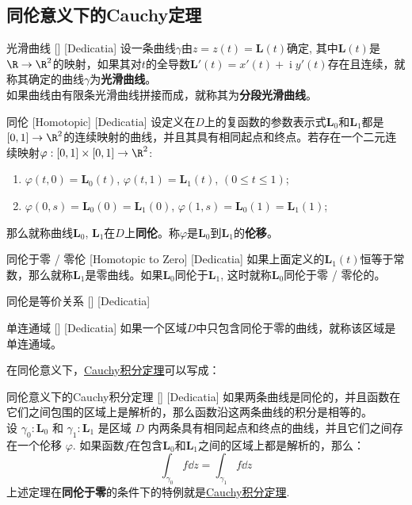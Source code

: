 \documentclass[UTF8]{ctexart}
\DeclareMathOperator{\ii}{\mathrm{i}}
\newcommand{\CauchyThm}{\hyperref[thm:Cauchy]{Cauchy积分定理}}
\begin{document}
\subsection{同伦意义下的Cauchy定理}
\begin{dfn}
    [UUID]
    {光滑曲线}
    []
    [Dedicatia]
    设一条曲线$\gamma$由$z=z(t)=\bm{L}(t)$确定, 其中$\bm{L}(t)$是$\R\to\R^2$的映射，如果其对$t$的全导数$\bm{L}'(t)=x'(t)+\ii y'(t)$存在且连续，就称其确定的曲线$\gamma$为\textbf{光滑曲线}。\\
    如果曲线由有限条光滑曲线拼接而成，就称其为\textbf{分段光滑曲线}。
\end{dfn}
\begin{dfn}
    [UUID]
    {同伦}
    [Homotopic]
    [Dedicatia]
    设定义在$D$上的复函数的参数表示式$\bm{L}_0$和$\bm{L}_1$都是$[0,1]\to\R^2$的连续映射的曲线，并且其具有相同起点和终点。若存在一个二元连续映射$\varphi:[0,1]\times[0,1]\to\R^2$:
    \begin{enumerate}
        \item $\varphi(t,0)=\bm{L}_0(t)$, $\varphi(t,1)=\bm{L}_1(t)$, $(0\leq t\leq 1)$;
        \item $\varphi(0,s)=\bm{L}_0(0)=\bm{L}_1(0)$, $\varphi(1,s)=\bm{L}_0(1)=\bm{L}_1(1)$;
    \end{enumerate}
    那么就称曲线$\bm{L}_0$, $\bm{L}_1$在$D$上\textbf{同伦}。称$\varphi$是$\bm{L}_0$到$\bm{L}_1$的\textbf{伦移}。
\end{dfn}
\begin{dfn}
    [UUID]
    {同伦于零 / 零伦}
    [Homotopic to Zero]
    [Dedicatia]
    如果上面定义的$\bm{L}_1(t)$恒等于常数，那么就称$\bm{L}_1$是零曲线。如果$\bm{L}_0$同伦于$\bm{L}_1$, 这时就称$\bm{L}_0$同伦于零 / 零伦的。
\end{dfn}
\begin{ppt}
    [UUID]
    {同伦是等价关系}
    []
    [Dedicatia]
\end{ppt}
\begin{dfn}
    [UUID]
    {单连通域}
    []
    [Dedicatia]
    如果一个区域$D$中只包含同伦于零的曲线，就称该区域是单连通域。
\end{dfn}
在同伦意义下，\CauchyThm 可以写成：
\begin{thm}
    [UUID]
    {同伦意义下的Cauchy积分定理}
    []
    [Dedicatia]
    如果两条曲线是同伦的，并且函数在它们之间包围的区域上是解析的，那么函数沿这两条曲线的积分是相等的。\\
    设 $\gamma_0:\bm{L}_0$ 和 $\gamma_1:\bm{L}_1$ 是区域 $D$ 内两条具有相同起点和终点的曲线，并且它们之间存在一个伦移 $\varphi$. 如果函数$f$在包含$\bm{L}_0$和$\bm{L}_1$之间的区域上都是解析的，那么：
    \[\int_{\gamma_0}f\dd{z}=\int_{\gamma_1}f\dd{z}\]
    上述定理在\textbf{同伦于零}的条件下的特例就是\CauchyThm .
\end{thm}
\end{document}
